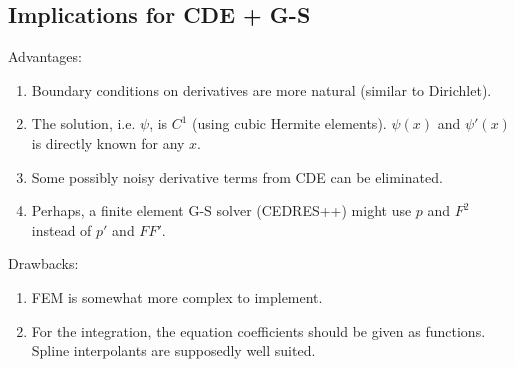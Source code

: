 

\subsection{Implications for CDE + G-S}

Advantages:
\begin{enumerate}
	\item Boundary conditions on derivatives are more natural (similar to Dirichlet).
	\item The solution, i.e. $\psi$, is $C^1$ (using cubic Hermite elements). 
	$\psi\left( x\right)$ and $\psi'\left( x\right)$ is directly known for any $x$.
	\item Some possibly noisy derivative terms from CDE can be eliminated.
	\item Perhaps, a finite element G-S solver (CEDRES++) might use $p$ and $F^2$ instead of $p'$ and $FF'$.
\end{enumerate}
Drawbacks:
\begin{enumerate}
	\item FEM is somewhat more complex to implement.
	\item For the integration, the equation coefficients should be given as functions. Spline interpolants are supposedly well suited.
\end{enumerate}